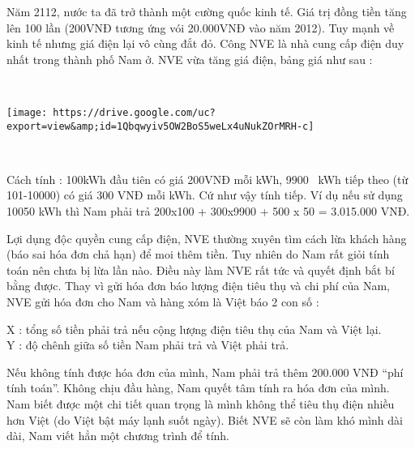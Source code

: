 Năm 2112, nước ta đã trở thành một cường quốc kinh tế. Giá trị đồng tiền tăng lên 100 lần (200VNĐ tương ứng vói 20.000VNĐ vào năm 2012). Tuy mạnh về kinh tế nhưng giá điện lại vô cùng đắt đỏ. Công NVE là nhà cung cấp điện duy nhất trong thành phố Nam ở. NVE vừa tăng giá điện, bảng giá như sau :

 


\texttt{[image: https://drive.google.com/uc?export=view\&amp;id=1Qbqwyiv5OW2BoS5weLx4uNukZOrMRH-c]}

 

Cách tính : 100kWh đầu tiên có giá 200VNĐ mỗi kWh, 9900  kWh tiếp theo (từ 101-10000) có giá 300 VNĐ mỗi kWh. Cứ như vậy tính tiếp. Ví dụ nếu sử dụng 10050 kWh thì Nam phải trả 200x100 + 300x9900 + 500 x 50 = 3.015.000 VNĐ.

Lợi dụng độc quyền cung cấp điện, NVE thường xuyên tìm cách lừa khách hàng (báo sai hóa đơn chả hạn) để moi thêm tiền. Tuy nhiên do Nam rất giỏi tính toán nên chưa bị lừa lần nào. Điều này làm NVE rất tức và quyết định bắt bí bằng được. Thay vì gửi hóa đơn báo lượng điện tiêu thụ và chi phí của Nam, NVE gửi hóa đơn cho Nam và hàng xóm là Việt báo 2 con số :

X : tổng số tiền phải trả nếu cộng lượng điện tiêu thụ của Nam và Việt lại.
\\Y : độ chênh giữa số tiền Nam phải trả và Việt phải trả.

Nếu không tính được hóa đơn của mình, Nam phải trả thêm 200.000 VNĐ “phí tính toán”. Không chịu đầu hàng, Nam quyết tâm tính ra hóa đơn của mình. Nam biết được một chi tiết quan trọng là mình không thể tiêu thụ điện nhiều hơn Việt (do Việt bật máy lạnh suốt ngày). Biết NVE sẽ còn làm khó mình dài dài, Nam viết hẳn một chương trình để tính.

\